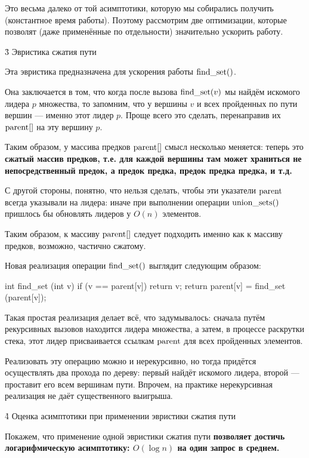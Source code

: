 Это весьма далеко от той асимптотики, которую мы собирались получить (константное время работы). Поэтому рассмотрим две оптимизации, которые позволят (даже применённые по отдельности) значительно ускорить работу.



\h3{ Эвристика сжатия пути }

Эта эвристика предназначена для ускорения работы ${\rm find\_set}()$.

Она заключается в том, что когда после вызова ${\rm find\_set}(v)$ мы найдём искомого лидера $p$ множества, то запомним, что у вершины $v$ и всех пройденных по пути вершин --- именно этот лидер $p$. Проще всего это сделать, перенаправив их ${\rm parent}[]$ на эту вершину $p$.

Таким образом, у массива предков ${\rm parent}[]$ смысл несколько меняется: теперь это \bf{сжатый массив предков}, т.е. для каждой вершины там может храниться не непосредственный предок, а предок предка, предок предка предка, и т.д.

С другой стороны, понятно, что нельзя сделать, чтобы эти указатели ${\rm parent}$ всегда указывали на лидера: иначе при выполнении операции ${\rm union\_sets}()$ пришлось бы обновлять лидеров у $O(n)$ элементов.

Таким образом, к массиву ${\rm parent}[]$ следует подходить именно как к массиву предков, возможно, частично сжатому.

Новая реализация операции ${\rm find\_set}()$ выглядит следующим образом:

\code
int find_set (int v) {
	if (v == parent[v])
		return v;
	return parent[v] = find_set (parent[v]);
}
\endcode

Такая простая реализация делает всё, что задумывалось: сначала путём рекурсивных вызовов находится лидера множества, а затем, в процессе раскрутки стека, этот лидер присваивается ссылкам ${\rm parent}$ для всех пройденных элементов.

Реализовать эту операцию можно и нерекурсивно, но тогда придётся осуществлять два прохода по дереву: первый найдёт искомого лидера, второй --- проставит его всем вершинам пути. Впрочем, на практике нерекурсивная реализация не даёт существенного выигрыша.


\h4{ Оценка асимптотики при применении эвристики сжатия пути }

Покажем, что применение одной эвристики сжатия пути \bf{позволяет достичь логарифмическую асимптотику}: $O(\log n)$ на один запрос в среднем.

